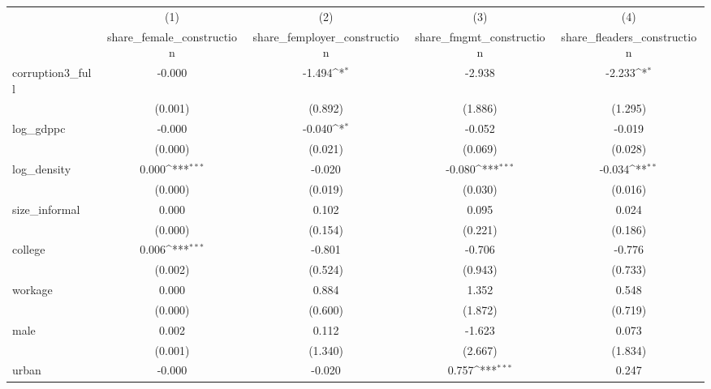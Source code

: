 {
\def\sym#1{\ifmmode^{#1}\else\(^{#1}\)\fi}
\begin{tabular}{l*{4}{c}}
\hline\hline
            &\multicolumn{1}{c}{(1)}&\multicolumn{1}{c}{(2)}&\multicolumn{1}{c}{(3)}&\multicolumn{1}{c}{(4)}\\
            &\multicolumn{1}{c}{share\_female\_construction}&\multicolumn{1}{c}{share\_femployer\_construction}&\multicolumn{1}{c}{share\_fmgmt\_construction}&\multicolumn{1}{c}{share\_fleaders\_construction}\\
\hline
corruption3\_full&      -0.000         &      -1.494\sym{*}  &      -2.938         &      -2.233\sym{*}  \\
            &     (0.001)         &     (0.892)         &     (1.886)         &     (1.295)         \\
[1em]
log\_gdppc   &      -0.000         &      -0.040\sym{*}  &      -0.052         &      -0.019         \\
            &     (0.000)         &     (0.021)         &     (0.069)         &     (0.028)         \\
[1em]
log\_density &       0.000\sym{***}&      -0.020         &      -0.080\sym{***}&      -0.034\sym{**} \\
            &     (0.000)         &     (0.019)         &     (0.030)         &     (0.016)         \\
[1em]
size\_informal&       0.000         &       0.102         &       0.095         &       0.024         \\
            &     (0.000)         &     (0.154)         &     (0.221)         &     (0.186)         \\
[1em]
college     &       0.006\sym{***}&      -0.801         &      -0.706         &      -0.776         \\
            &     (0.002)         &     (0.524)         &     (0.943)         &     (0.733)         \\
[1em]
workage     &       0.000         &       0.884         &       1.352         &       0.548         \\
            &     (0.000)         &     (0.600)         &     (1.872)         &     (0.719)         \\
[1em]
male        &       0.002         &       0.112         &      -1.623         &       0.073         \\
            &     (0.001)         &     (1.340)         &     (2.667)         &     (1.834)         \\
[1em]
urban       &      -0.000         &      -0.020         &       0.757\sym{***}&       0.247         \\

\end{tabular}}
